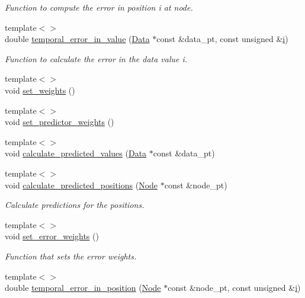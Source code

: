 \begin{DoxyCompactItemize}
\begin{DoxyCompactList}\small\item\em Function to compute the error in position i at node. \end{DoxyCompactList}\item 
{\footnotesize template$<$$>$ }\\double \hyperlink{classoomph_1_1BDF_a620de844b609fd064f405a5831d1defe}{temporal\+\_\+error\+\_\+in\+\_\+value} (\hyperlink{classoomph_1_1Data}{Data} $\ast$const \&data\+\_\+pt, const unsigned \&\hyperlink{cfortran_8h_adb50e893b86b3e55e751a42eab3cba82}{i})
\begin{DoxyCompactList}\small\item\em Function to calculate the error in the data value i. \end{DoxyCompactList}\item 
{\footnotesize template$<$$>$ }\\void \hyperlink{classoomph_1_1BDF_acc878d9a57bf6a68478558e89e6408c9}{set\+\_\+weights} ()
\item 
{\footnotesize template$<$$>$ }\\void \hyperlink{classoomph_1_1BDF_a77a34b38a52120ed7eb9fec88bfdc3ca}{set\+\_\+predictor\+\_\+weights} ()
\item 
{\footnotesize template$<$$>$ }\\void \hyperlink{classoomph_1_1BDF_a5fa759b3a661e7a41ea0dc21f894708d}{calculate\+\_\+predicted\+\_\+values} (\hyperlink{classoomph_1_1Data}{Data} $\ast$const \&data\+\_\+pt)
\item 
{\footnotesize template$<$$>$ }\\void \hyperlink{classoomph_1_1BDF_a908d5e82020a1083dfb82719efc5c987}{calculate\+\_\+predicted\+\_\+positions} (\hyperlink{classoomph_1_1Node}{Node} $\ast$const \&node\+\_\+pt)
\begin{DoxyCompactList}\small\item\em Calculate predictions for the positions. \end{DoxyCompactList}\item 
{\footnotesize template$<$$>$ }\\void \hyperlink{classoomph_1_1BDF_afef7f18c1227c5c96910331ab2b987e6}{set\+\_\+error\+\_\+weights} ()
\begin{DoxyCompactList}\small\item\em Function that sets the error weights. \end{DoxyCompactList}\item 
{\footnotesize template$<$$>$ }\\double \hyperlink{classoomph_1_1BDF_ad426b903004b13c34dd8df5ea2e1fec5}{temporal\+\_\+error\+\_\+in\+\_\+position} (\hyperlink{classoomph_1_1Node}{Node} $\ast$const \&node\+\_\+pt, const unsigned \&\hyperlink{cfortran_8h_adb50e893b86b3e55e751a42eab3cba82}{i})

\end{DoxyCompactItemize}
